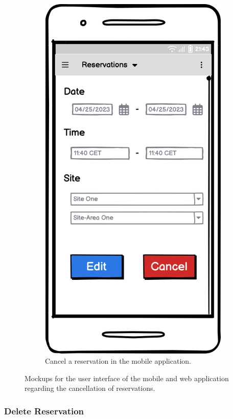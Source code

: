 \begin{figure}[h]
\begin{subfigure}[c]{0.3\textwidth}
         \includegraphics[width=\textwidth,height=1.6\textwidth,keepaspectratio]{resources/images/main/5_design/mockups/cancel_reservation/mobile/Cancel_Reservation.png}
         \caption{Cancel a reservation in the mobile application.}
         \label{fig:mobile-cancel-reservation-mockup}
    \end{subfigure}
    \caption{Mockups for the user interface of the mobile and web application regarding the cancellation of reservations.}
    \label{fig:mockups-cancel-reservation}
\end{figure}

\newpage

\subsubsection{Delete Reservation}
\label{ch:Design:sec:Reservation System:ssec:Management Capabilities:sssec:Delete Reservation}

